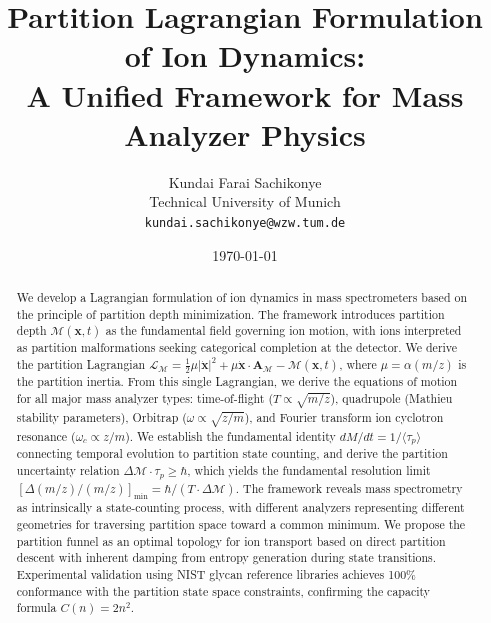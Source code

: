 \documentclass[twocolumn,10pt,a4paper]{article}
\theoremstyle{definition}
\theoremstyle{remark}
\newcommand{\Mdepth}{\mathcal{M}}
\newcommand{\Lagr}{\mathcal{L}}
\newcommand{\Apartition}{\mathbf{A}_{\mathcal{M}}}
\newcommand{\partinert}{\mu}
\newcommand{\taup}{\tau_p}
\begin{document}
\title{\textbf{Partition Lagrangian Formulation of Ion Dynamics:\\A Unified Framework for Mass Analyzer Physics}}

\author{
Kundai Farai Sachikonye\\
Technical University of Munich\\
\texttt{kundai.sachikonye@wzw.tum.de}
}

\date{\today}

\maketitle

\begin{abstract}
We develop a Lagrangian formulation of ion dynamics in mass spectrometers based on the principle of partition depth minimization. The framework introduces partition depth $\Mdepth(\mathbf{x}, t)$ as the fundamental field governing ion motion, with ions interpreted as partition malformations seeking categorical completion at the detector. We derive the partition Lagrangian $\Lagr_{\Mdepth} = \frac{1}{2}\partinert|\dot{\mathbf{x}}|^2 + \partinert\dot{\mathbf{x}}\cdot\Apartition - \Mdepth(\mathbf{x}, t)$, where $\partinert = \alpha(m/z)$ is the partition inertia. From this single Lagrangian, we derive the equations of motion for all major mass analyzer types: time-of-flight ($T \propto \sqrt{m/z}$), quadrupole (Mathieu stability parameters), Orbitrap ($\omega \propto \sqrt{z/m}$), and Fourier transform ion cyclotron resonance ($\omega_c \propto z/m$). We establish the fundamental identity $dM/dt = 1/\langle\taup\rangle$ connecting temporal evolution to partition state counting, and derive the partition uncertainty relation $\Delta\Mdepth \cdot \taup \geq \hbar$, which yields the fundamental resolution limit $[\Delta(m/z)/(m/z)]_{\min} = \hbar/(T\cdot\Delta\Mdepth)$. The framework reveals mass spectrometry as intrinsically a state-counting process, with different analyzers representing different geometries for traversing partition space toward a common minimum. We propose the partition funnel as an optimal topology for ion transport based on direct partition descent with inherent damping from entropy generation during state transitions. Experimental validation using NIST glycan reference libraries achieves 100\% conformance with the partition state space constraints, confirming the capacity formula $C(n) = 2n^2$.
\end{abstract}

\end{document}
